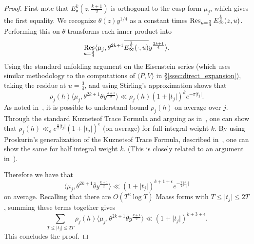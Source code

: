\begin{proof}
  First note that $E^k_\mathfrak{a}(z, \tfrac{k+1}{2})$ is orthogonal to the cusp form
  $\mu_j$, which gives the first equality.
  We recognize $\theta(z) y^{1/4}$ as a constant times $\operatorname*{Res}_{u = \frac{3}{4}}
  E_\infty^{\frac{1}{2}}(z,u)$.
  Performing this on $\overline{\theta}$ transforms each inner product into
  \begin{equation}
    \operatorname*{Res}_{u = \frac{3}{4}} \langle \mu_j, \theta^{2k+1}
    \overline{E_\infty^{\frac{1}{2}}(\cdot,u)} y^{\frac{2k+1}{4}}\rangle.
  \end{equation}
  Using the standard unfolding argument on the Eisenstein series (which uses similar
  methodology to the computations of $\langle P, V \rangle$ in
  \S\ref{ssec:direct_expansion}), taking the residue at $u = \frac{3}{4}$, and using
  Stirling's approximation shows that
  \begin{equation}
    \rho_j(h) \langle \mu_j, \theta^{2k+1} \overline{\theta} y^{\frac{k+1}{2}} \rangle
    \ll
    \rho_j(h) (1 + \lvert t_j \rvert)^k e^{-\pi \lvert t_j \rvert}.
  \end{equation}
  As noted in~\cite{hulseCountingSquare}, it is possible to understand bound $\rho_j(h)$
  on average over $j$.
  Through the standard Kuznetsof Trace Formula and arguing as in~\cite{HoffsteinHulse13},
  one can show that $\rho_j(h) \ll_\epsilon e^{\frac{\pi}{2}\lvert t_j \rvert}(1 + \lvert
  t_j \rvert)^\epsilon$ (on average) for full integral weight $k$.
  By using Proskurin's generalization of the Kuznetsof Trace Formula, described
  in~\cite{Duke88}, one can show the same for half integral weight $k$.
  (This is closely related to an argument in~\cite{hulseCountingSquare}).


  Therefore we have that
  \begin{equation}
    \langle \mu_j, \theta^{2k+1} \overline{\theta} y^{\frac{k+1}{2}} \rangle \ll (1 +
    \lvert t_j \rvert)^{k + 1 + \epsilon} e^{-\frac{\pi}{2} \lvert t_j \rvert}
  \end{equation}
  on average.
  Recalling that there are $O(T^2 \log T)$ Maass forms with $T \leq \lvert t_j \rvert \leq
  2T$, summing these terms together gives
  \begin{equation}
    \sum_{T \leq \lvert t_j \rvert \leq 2T} \rho_j(h) \langle \mu_j, \theta^{2k+1}
    \overline{\theta} y^{\frac{k+1}{2}} \rangle \ll (1 + \lvert t_j \rvert)^{k + 3 +
    \epsilon}.
  \end{equation}
  This concludes the proof.
\end{proof}



